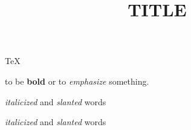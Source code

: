 \documentclass[a4paper]{article}
\title{TITLE}
\author{}
\date{}
\begin{document}
\TeX

to be {\bf bold} or to {\sl emphasize} something.

{\it italicized\/} and {\sl slanted\/} words

{\it italicized} and {\sl slanted} words
\end{document}
